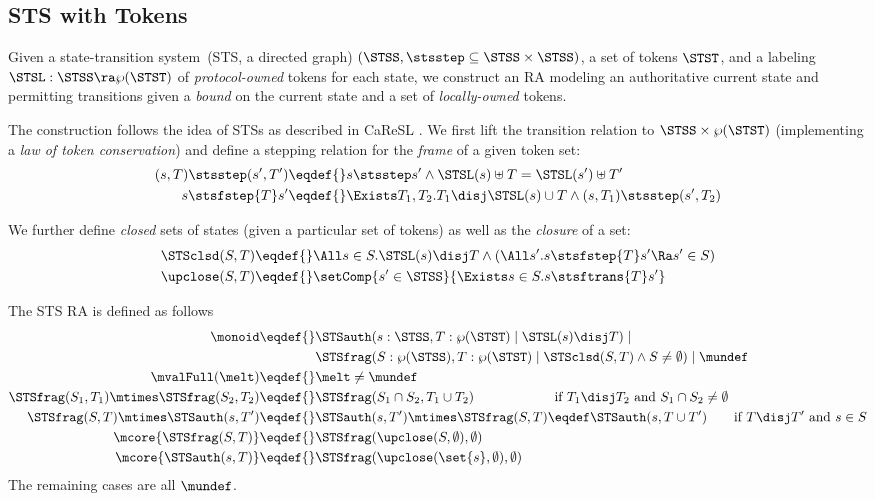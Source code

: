 \subsection{STS with Tokens}
\label{sec:sts-camera}

Given a state-transition system~(STS, \ie a directed graph) $(\STSS, {\stsstep} \subseteq \STSS \times \STSS)$, a set of tokens $\STST$, and a labeling $\STSL: \STSS \ra \wp(\STST)$ of \emph{protocol-owned} tokens for each state, we construct an RA modeling an authoritative current state and permitting transitions given a \emph{bound} on the current state and a set of \emph{locally-owned} tokens.

The construction follows the idea of STSs as described in CaReSL \cite{caresl}.
We first lift the transition relation to $\STSS \times \wp(\STST)$ (implementing a \emph{law of token conservation}) and define a stepping relation for the \emph{frame} of a given token set:
\begin{align*}
 (s, T) \stsstep (s', T') \eqdef{}& s \stsstep s' \land \STSL(s) \uplus T = \STSL(s') \uplus T' \\
 s \stsfstep{T} s' \eqdef{}& \Exists T_1, T_2. T_1 \disj \STSL(s) \cup T \land (s, T_1) \stsstep (s', T_2)
\end{align*}

We further define \emph{closed} sets of states (given a particular set of tokens) as well as the \emph{closure} of a set:
\begin{align*}
\STSclsd(S, T) \eqdef{}& \All s \in S. \STSL(s) \disj T \land \left(\All s'. s \stsfstep{T} s' \Ra s' \in S\right) \\
\upclose(S, T) \eqdef{}& \setComp{ s' \in \STSS}{\Exists s \in S. s \stsftrans{T} s' }
\end{align*}

The STS RA is defined as follows
\begin{align*}
  \monoid \eqdef{}& \STSauth(s:\STSS, T:\wp(\STST) \mid \STSL(s) \disj T) \mid{}\\& \STSfrag(S: \wp(\STSS), T: \wp(\STST) \mid \STSclsd(S, T) \land S \neq \emptyset) \mid \mundef \\
  \mvalFull(\melt) \eqdef{}& \melt \neq \mundef \\
  \STSfrag(S_1, T_1) \mtimes \STSfrag(S_2, T_2) \eqdef{}& \STSfrag(S_1 \cap S_2, T_1 \cup T_2) \qquad\qquad\qquad \text{if $T_1 \disj T_2$ and $S_1 \cap S_2 \neq \emptyset$} \\
  \STSfrag(S, T) \mtimes \STSauth(s, T') \eqdef{}& \STSauth(s, T') \mtimes \STSfrag(S, T) \eqdef \STSauth(s, T \cup T') \qquad \text{if $T \disj T'$ and $s \in S$} \\
  \mcore{\STSfrag(S, T)} \eqdef{}& \STSfrag(\upclose(S, \emptyset), \emptyset) \\
  \mcore{\STSauth(s, T)} \eqdef{}& \STSfrag(\upclose(\set{s}, \emptyset), \emptyset)
\end{align*}
The remaining cases are all $\mundef$.

